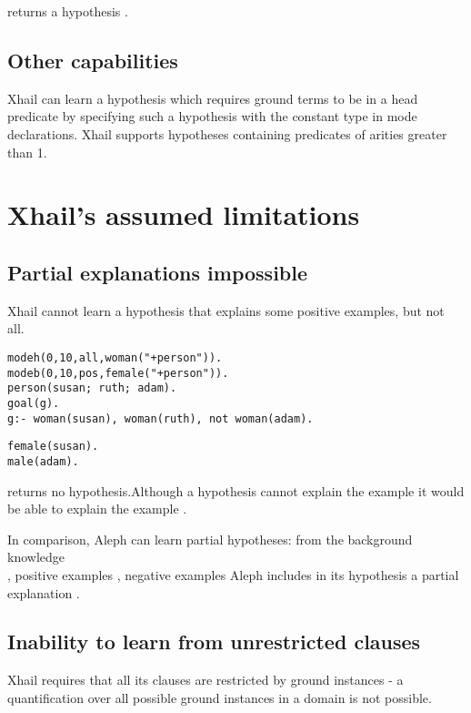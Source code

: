 returns a hypothesis
.
\subsection{Other capabilities}
Xhail can learn a hypothesis which requires ground terms to be in a head predicate by specifying such a hypothesis with the constant type  in mode declarations. Xhail supports hypotheses containing predicates of arities greater than 1.

\section{Xhail's assumed limitations}

\subsection{Partial explanations impossible}
Xhail cannot learn a hypothesis that explains some positive examples, but not all.

\begin{minipage}[t]{.60\textwidth}
\begin{lstlisting}
modeh(0,10,all,woman("+person")).
modeb(0,10,pos,female("+person")).
person(susan; ruth; adam).
goal(g).
g:- woman(susan), woman(ruth), not woman(adam).
\end{lstlisting}
\end{minipage}
\begin{minipage}[t]{.20\textwidth}
\begin{lstlisting}
female(susan).
male(adam).
\end{lstlisting}
\end{minipage}

returns no hypothesis.Although a hypothesis
 cannot explain the example  it would be able to explain the example .

In comparison, Aleph can learn partial hypotheses: from the background knowledge\\
, positive examples , negative examples  Aleph includes in its hypothesis a partial explanation
.

\subsection{Inability to learn from unrestricted clauses}\label{xhail_inability_to_learn_from_unrestricted_clauses}
Xhail requires that all its clauses are restricted by ground instances - a quantification over all possible ground instances in a domain is not possible.

